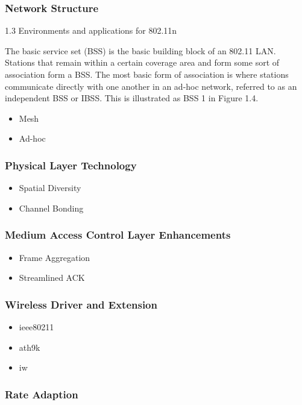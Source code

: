 \subsubsection{Network Structure}

1.3 Environments and applications for 802.11n

The basic service set (BSS) is the basic building block of an 802.11 LAN. Stations that
remain within a certain coverage area and form some sort of association form a BSS. The
most basic form of association is where stations communicate directly with one another
in an ad-hoc network, referred to as an independent BSS or IBSS. This is illustrated as
BSS 1 in Figure 1.4.

\begin{itemize}
  \item Mesh
  \item Ad-hoc
\end{itemize}

\subsubsection{Physical Layer Technology}
\begin{itemize}
  \item Spatial Diversity
  \item Channel Bonding
\end{itemize}

\subsubsection{Medium Access Control Layer Enhancements}
\begin{itemize}
  \item Frame Aggregation
  \item Streamlined ACK
\end{itemize}

\subsubsection{Wireless Driver and Extension}
\begin{itemize}
  \item ieee80211
  \item ath9k
  \item iw
\end{itemize}

\subsubsection{Rate Adaption}

